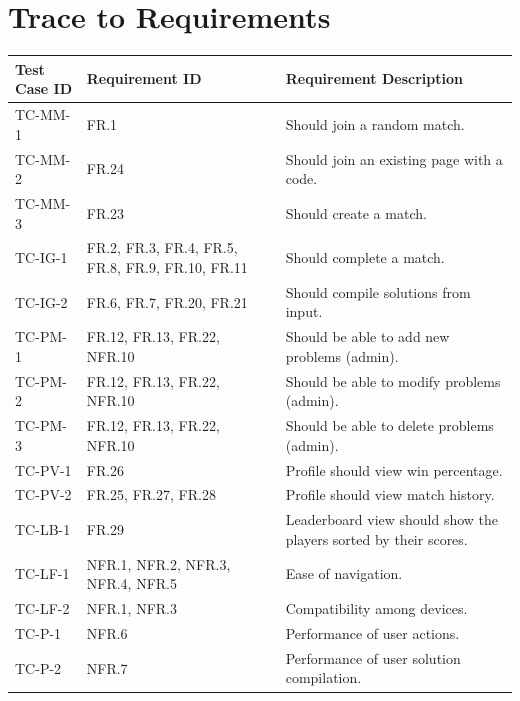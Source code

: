 \documentclass[12pt, titlepage]{article}
\begin{document}
\section{Trace to Requirements}
\begin{longtable}{| p{2.5cm} | p{3cm} | p{8cm}| }
    \hline
    Test Case ID & Requirement ID & Requirement Description\\
    \hline
    TC-MM-1 & FR.1 & Should join a random match.\\
    \hline
    TC-MM-2 & FR.24 & Should join an existing page with a code. \\
     \hline
    TC-MM-3 & FR.23 & Should create a match. \\
     \hline
    TC-IG-1 & FR.2, FR.3, FR.4, FR.5, FR.8, FR.9, FR.10, FR.11 & Should complete a match. \\
     \hline
    TC-IG-2 & FR.6, FR.7, FR.20, FR.21 & Should compile solutions from input.\\
     \hline
    TC-PM-1 & FR.12, FR.13, FR.22, NFR.10 & Should be able to add new problems (admin).\\
     \hline
    TC-PM-2 & FR.12, FR.13, FR.22, NFR.10 & Should be able to modify problems (admin).\\
     \hline
    TC-PM-3 & FR.12, FR.13, FR.22, NFR.10 & Should be able to delete problems (admin).\\
     \hline
    TC-PV-1 & FR.26 & Profile should view win percentage.\\
     \hline
    TC-PV-2 & FR.25, FR.27, FR.28  & Profile should view match history.\\
     \hline
    TC-LB-1 & FR.29 & Leaderboard view should show the players sorted by their scores.\\
     \hline
    TC-LF-1 & NFR.1, NFR.2, NFR.3, NFR.4, NFR.5 & Ease of navigation.\\
    \hline
    TC-LF-2 & NFR.1, NFR.3  & Compatibility among devices.\\
    \hline
     TC-P-1 & NFR.6 & Performance of user actions.\\
    \hline
    TC-P-2 & NFR.7 & Performance of user solution compilation.\\

\end{longtable}
\end{document}
